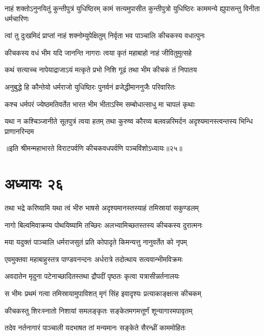 \threelineshloka
{नाहं शक्तोऽनुनयितुं कुन्तीपुत्रं युधिष्ठिरम्}
{कामं सत्यमुपासीत कुन्तीपुत्रो युधिष्ठिरः}
{काममन्ये ह्युपासन्तु विनीता धर्मचारिणः}


\twolineshloka
{त्वां तु दुःखमिदं प्राप्तां नाहं शक्नोम्युपेक्षितुम्}
{निर्वृता भव पाञ्चालि कीचकस्य वधात्पुनः}




\twolineshloka
{कीचकस्य वधं भीम यदि जानन्ति नागराः}
{त्वया कृतं महाबाहो नाहं जीवितुमुत्सहे}


\twolineshloka
{कथं सत्याच्च नापेयाद्राजाऽयं मत्कृते प्रभो}
{निशि गूढं तथा भीम कीचकं तं निपातय}


\twolineshloka
{अनुबुद्धे हि कौन्तेयो धर्मराजो युधिष्ठिरः}
{पुनर्वनं व्रजेद्धीमाननुजैः परिवारितः}


\twolineshloka
{कश्च धर्मपरं ज्येष्ठमतिवर्तेत भारत}
{भीम भीताऽस्मि सम्बोधात्साधु मा चापलं कृथाः}


\threelineshloka
{यथा न कश्चिञ्जानीते सूतपुत्रं त्वया हतम्}
{तथा कुरुष्व कौरव्य बलवन्नरिमर्दन}
{अदृश्यमानस्त्वन्तस्य भिन्धि प्राणानरिन्दम}

॥इति श्रीमन्महाभारते विराटपर्वणि कीचकवधपर्वणि पञ्चविंशोऽध्यायः॥२५॥

\chapter{अध्यायः २६}

\twolineshloka
{तथा भद्रे करिष्यामि यथा त्वं भीरु भाषसे}
{अदृश्यमानस्तस्याहं तमिस्रायां सकुण्डलम्}


\twolineshloka
{नागो बिल्वमिवाक्रम्य पोथयिष्यामि तच्छिरः}
{अलभ्यामिच्छतस्तस्य कीचकस्य दुरात्मनः}


\twolineshloka
{मया यदुक्तं पाञ्चालि धर्मराजसुतं प्रति}
{कोपादृते किमन्यत्तु नानुवर्तेत को नृपम्}



\twolineshloka
{एवमुक्तवा महाबाहुस्तत्र पाण्डवनन्दनः}
{अर्धरात्रे तदोत्थाय सत्ववान्भीमविक्रमः}


\twolineshloka
{अवदातेन मृदुना पटेनाच्छादितस्तथा}
{द्रौपदीं पृष्ठतः कृत्वा यत्रासीन्नर्तनालयः}


\twolineshloka
{स भीमः प्रथमं गत्वा तमिस्रायामुपाविशत्}
{मृगं सिंह इवादृश्यः प्रत्याकाङ्क्षत्स कीचकम्}


\twolineshloka
{कीचकस्तु शिरःस्नातो निशायां समलङ्कृतः}
{सङ्केतमगमत्तूर्णं शून्यागारमपावृतम्}


\twolineshloka
{तदेव नर्तनागारं पाञ्चाली यदभाषत}
{तां मन्यमानः सङ्केते सैरन्ध्रीं काममोहितः}



